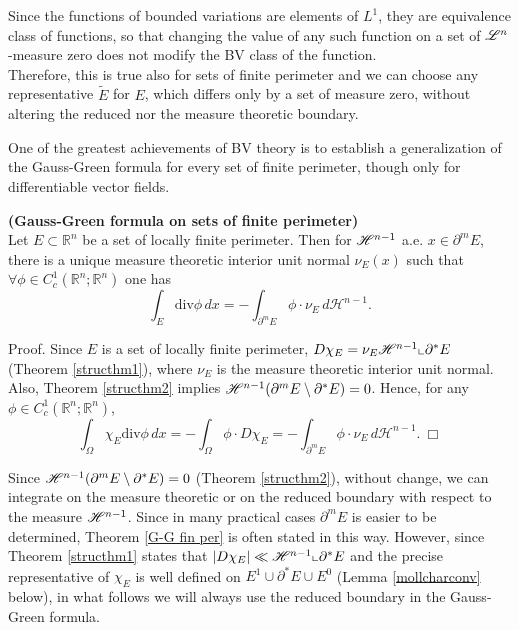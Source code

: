 \begin{remark} \label{setrepr} Since the functions of bounded variations are elements of $L^{1}$, they are equivalence class of functions, so that changing the value of any such function on a set of $\mathscr{L}^{n}$-measure zero does not modify the BV class of the function.
\\
Therefore, this is true also for sets of finite perimeter and we can choose any representative $\widetilde{E}$ for $E$, which differs only by a set of measure zero, without altering the reduced nor the measure theoretic boundary.
\end{remark}

One of the greatest achievements of BV theory is to establish a generalization of the Gauss-Green formula for every set of finite perimeter, though only for differentiable vector fields. 

\begin{theorem} \label{G-G fin per} {\bf (Gauss-Green formula on sets of finite perimeter)}
\\
Let $E \subset \mathbb{R}^{n}$ be a set of locally finite perimeter. Then for $\mathscr{H}^{n-1}$ a.e. $x \in \partial^{m} E$, there is a unique measure theoretic interior unit normal $\nu_{E}(x)$ such that $\forall \phi \in C_{c}^{1}(\mathbb{R}^{n}; \mathbb{R}^{n})$ one has
\[ \int_{E} \mathrm{div}\phi\, dx = - \int_{\partial^{m} E} \phi \cdot \nu_{E}\, d\mathcal{H}^{n-1}. \]
\end{theorem}
Proof. Since $E$ is a set of locally finite perimeter, $D \chi_{E} = \nu_{E} \mathscr{H}^{n - 1} \llcorner \partial^{*} E$ (Theorem \ref{structhm1}), where $\nu_{E}$ is the measure theoretic interior unit normal. Also, Theorem \ref{structhm2} implies $\mathscr{H}^{n - 1}(\partial^{m} E \setminus \partial^{*} E) = 0$. Hence, for any $\phi \in C^{1}_{c}(\mathbb{R}^{n}; \mathbb{R}^{n})$,
\[ \int_{\Omega} \chi_{E} \mathrm{div}\phi\, dx = - \int_{\Omega} \phi \cdot D \chi_{E} = - \int_{\partial^{m} E} \phi \cdot \nu_{E}\, d\mathcal{H}^{n-1}. \ \Box \]

\begin{remark} Since $\mathscr{H}^{n - 1} (\partial^{m} E \setminus \partial^{*} E) = 0$ (Theorem \ref{structhm2}), without change, we can integrate on the measure theoretic or on the reduced boundary with respect to the measure $\mathscr{H}^{n - 1}$. Since in many practical cases $\partial^{m} E$ is easier to be determined, Theorem \ref{G-G fin per} is often stated in this way. However, since Theorem \ref{structhm1} states that $|D \chi_{E}| \ll \mathscr{H}^{n - 1} \llcorner \partial^{*} E$ and the precise representative of $\chi_{E}$ is well defined on $E^{1} \cup \partial^{*}E \cup E^{0}$ (Lemma \ref{mollcharconv} below), in what follows we will always use the reduced boundary in the Gauss-Green formula.
\end{remark}

